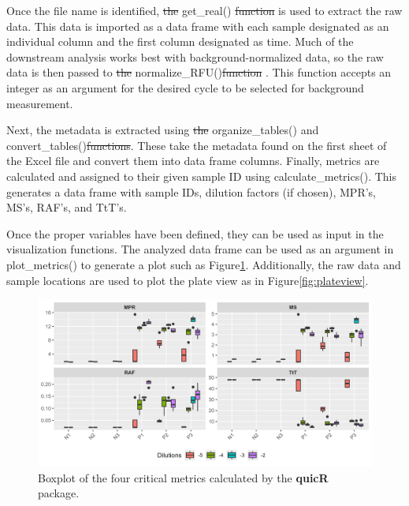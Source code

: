 \documentclass[preprint,12pt,a4paper]{elsarticle}
\providecommand{\DIFaddtex}[1]{{\protect\color{blue}\uwave{#1}}} %
\providecommand{\DIFdeltex}[1]{{\protect\color{red}\sout{#1}}} %
\providecommand{\DIFaddbegin}{} %
\providecommand{\DIFaddend}{} %
\providecommand{\DIFdelbegin}{} %
\providecommand{\DIFdelend}{} %
\providecommand{\DIFadd}[1]{\texorpdfstring{\DIFaddtex{#1}}{#1}} %
\providecommand{\DIFdel}[1]{\texorpdfstring{\DIFdeltex{#1}}{}} %
\begin{document}
            \DIFaddend Once the file name is identified, \DIFdelbegin \DIFdel{the }\DIFdelend get\_real() \DIFdelbegin \DIFdel{function }\DIFdelend is used to extract the raw data. This data is imported as a data frame with each sample designated as an individual column and the first column designated as time. Much of the downstream analysis works best with background-normalized data, so the raw data is then passed to \DIFdelbegin \DIFdel{the }\DIFdelend normalize\_RFU()\DIFdelbegin \DIFdel{function }\DIFdelend \DIFaddbegin \DIFadd{~}\DIFaddend \cite{Rowden2023}. This function accepts an integer as an argument for the desired cycle to be selected for background measurement. 

            Next, the metadata is extracted using \DIFdelbegin \DIFdel{the }\DIFdelend organize\_tables() and convert\_tables()\DIFdelbegin\DIFdel{functions}\DIFdelend. These take the metadata found on the first sheet of the Excel file and convert them into data frame columns. Finally, metrics are calculated and assigned to their given sample ID using calculate\_metrics(). This generates a data frame with sample IDs, dilution factors (if chosen), MPR's, MS's, RAF's, and TtT's.

            Once the proper variables have been defined, they can be used as input in the visualization functions. The analyzed data frame can be used as an argument in plot\_metrics() to generate a plot such as Figure\DIFaddbegin \DIFadd{~}\DIFaddend \ref{fig:boxplot}. Additionally, the raw data and sample locations are used to plot the plate view as in Figure\DIFaddbegin \DIFadd{~}\DIFaddend \ref{fig:plateview}.

            \begin{figure}[ht]
                \centering
                \includegraphics[width=\textwidth]{images/boxplot.png}
                \caption{Boxplot of the four critical metrics calculated by the \textbf{quicR} package.}\label{fig:boxplot}
            \end{figure}
\end{document}

